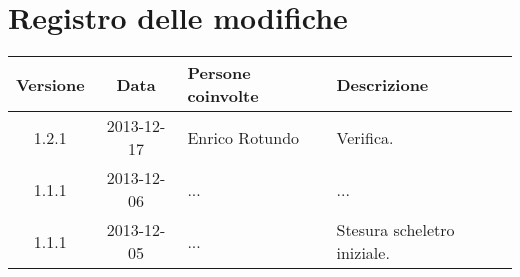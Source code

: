 \section*{Registro delle modifiche}

\small{
\begin{tabularx}{\textwidth}{|c|c|l|X|}
 \hline \textbf{Versione} & \textbf{Data} & \textbf{Persone coinvolte} & \textbf{Descrizione} \\

 
 \hline 1.2.1 & 2013-12-17 & Enrico Rotundo & Verifica. \\

 \hline 1.1.1 & 2013-12-06 & ... &
 ... \\

 \hline 1.1.1 & 2013-12-05 & ... &
 Stesura scheletro iniziale. \\

 \hline
\end{tabularx}
}
